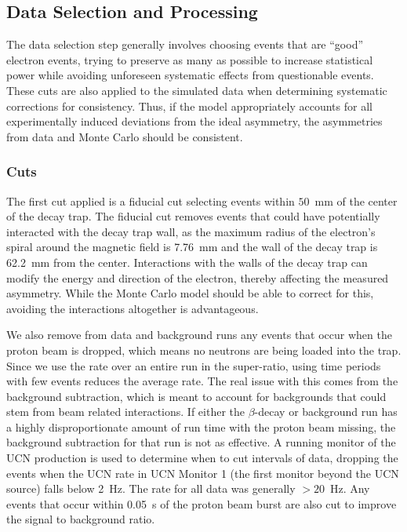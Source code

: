 \subsection{Data Selection and Processing}

The data selection step generally involves choosing events that are ``good'' electron
events, trying to preserve as many as possible to increase statistical power while avoiding
unforeseen systematic effects from questionable events. These cuts are also applied to
the simulated data when determining systematic corrections for consistency. Thus, if the
model appropriately accounts for all experimentally induced deviations from the ideal
asymmetry, the asymmetries from data and Monte Carlo should be consistent.

\subsubsection{Cuts} \label{ssec:dataCuts}%

The first cut applied is a fiducial cut
selecting events within $50$~mm of the center of the decay trap. The fiducial cut removes
events that could have potentially interacted with the decay trap wall, as the
maximum radius of the electron's spiral around the magnetic field is 7.76~mm and the wall
of the decay trap is 62.2~mm from the center. Interactions with the walls of the decay trap
can modify the energy and direction of the electron, thereby affecting the measured
asymmetry. While the Monte Carlo model should be able to correct for this, avoiding the
interactions altogether is advantageous.

We also remove from data and background runs
any events that occur when the proton beam is dropped, which means no neutrons
are being loaded into the trap. Since we use the rate over an entire run in the super-ratio,
using time periods with few events reduces the average rate. The real issue with this comes
from the background subtraction, which is meant to account for backgrounds that could stem
from beam related interactions. If either the $\beta$-decay or background run has a
highly disproportionate amount of run time with the proton beam missing, the background
subtraction for that run is not as effective. A running monitor of the UCN production is
used to determine when to cut intervals of data, dropping the events when the UCN rate
in UCN Monitor 1 (the first monitor beyond the UCN source) falls below 2~Hz.
The rate for all data was generally $>20$~Hz.
Any events that occur within 0.05~s of the proton beam burst are also cut to improve
the signal to background ratio.


